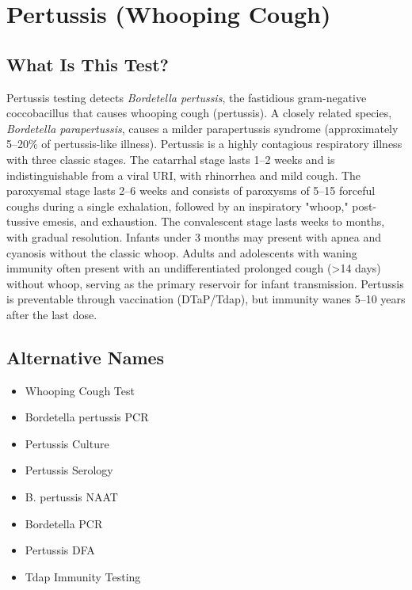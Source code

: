 \chapter{Pertussis (Whooping Cough)}

\section*{What Is This Test?}
Pertussis testing detects \textit{Bordetella pertussis}, the fastidious gram-negative coccobacillus that causes whooping cough (pertussis). A closely related species, \textit{Bordetella parapertussis}, causes a milder parapertussis syndrome (approximately 5--20\% of pertussis-like illness). Pertussis is a highly contagious respiratory illness with three classic stages. The catarrhal stage lasts 1--2 weeks and is indistinguishable from a viral URI, with rhinorrhea and mild cough. The paroxysmal stage lasts 2--6 weeks and consists of paroxysms of 5--15 forceful coughs during a single exhalation, followed by an inspiratory "whoop," post-tussive emesis, and exhaustion. The convalescent stage lasts weeks to months, with gradual resolution. Infants under 3 months may present with apnea and cyanosis without the classic whoop. Adults and adolescents with waning immunity often present with an undifferentiated prolonged cough (>14 days) without whoop, serving as the primary reservoir for infant transmission. Pertussis is preventable through vaccination (DTaP/Tdap), but immunity wanes 5--10 years after the last dose.

\section*{Alternative Names}
\begin{itemize}
  \item Whooping Cough Test
  \item Bordetella pertussis PCR
  \item Pertussis Culture
  \item Pertussis Serology
  \item B. pertussis NAAT
  \item Bordetella PCR
  \item Pertussis DFA
  \item Tdap Immunity Testing
\end{itemize}

